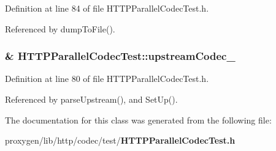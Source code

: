 Definition at line 84 of file H\+T\+T\+P\+Parallel\+Codec\+Test.\+h.



Referenced by dump\+To\+File().

\subsubsection[{upstream\+Codec\+\_\+}]{\& H\+T\+T\+P\+Parallel\+Codec\+Test\+::upstream\+Codec\+\_\+\hspace{0.3cm}{\ttfamily [protected]}}\label{classHTTPParallelCodecTest_a3cef96b1f1c7cdea4209652ed80b9474}


Definition at line 80 of file H\+T\+T\+P\+Parallel\+Codec\+Test.\+h.



Referenced by parse\+Upstream(), and Set\+Up().



The documentation for this class was generated from the following file\+:\begin{DoxyCompactItemize}
\item 
proxygen/lib/http/codec/test/{\bf H\+T\+T\+P\+Parallel\+Codec\+Test.\+h}\end{DoxyCompactItemize}
